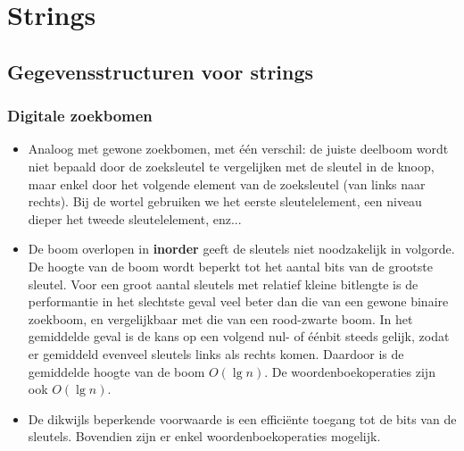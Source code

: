 \documentclass{report}
\begin{document}
\begin{itemize}
\end{itemize}


\part{Strings}
\chapter{Gegevensstructuren voor strings}
\section{Digitale zoekbomen}
\begin{itemize}
	\item[\info] Analoog met gewone zoekbomen, met één verschil: de juiste deelboom wordt niet bepaald door de zoeksleutel te vergelijken met de sleutel in de knoop, maar enkel door het volgende element van de zoeksleutel (van links naar rechts). Bij de wortel gebruiken we het eerste sleutelelement, een niveau dieper het tweede sleutelelement, enz...
	\item[\info] De boom overlopen in \textbf{inorder} geeft de sleutels niet noodzakelijk in volgorde. De hoogte van de boom wordt beperkt tot het aantal bits van de grootste sleutel. Voor een groot aantal sleutels met relatief kleine bitlengte is de performantie in het slechtste geval veel beter dan die van een gewone binaire zoekboom, en vergelijkbaar met die van een rood-zwarte boom. In het gemiddelde geval is de kans op een volgend nul- of éénbit steeds gelijk, zodat er gemiddeld evenveel sleutels links als rechts komen. Daardoor is de gemiddelde hoogte van de boom $O(\lg n)$. De woordenboekoperaties zijn ook $O(\lg n)$.
	\item[\alert] De dikwijls beperkende voorwaarde is een efficiënte toegang tot de bits van de sleutels. Bovendien zijn er enkel woordenboekoperaties mogelijk.
\end{itemize}
\end{document}
